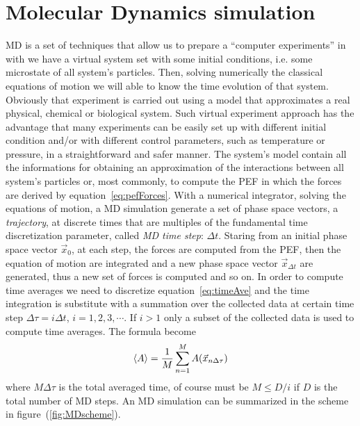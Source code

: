 \section{Molecular Dynamics simulation}
\acf{MD} is a set of techniques that allow us to prepare a ``computer experiments'' in with we have a virtual system set with some initial conditions, i.e. some microstate of all system's particles. Then, solving numerically the classical equations of motion we will able to know the time evolution of that system. Obviously that experiment is carried out using a model that approximates a real physical, chemical or biological system. Such virtual experiment approach has the advantage that many experiments can be easily set up with different initial condition and/or with different control parameters, such as temperature or pressure, in a straightforward and safer manner. The system's model contain all the informations for obtaining an approximation of the interactions between all system's particles or, most commonly, to compute the \ac{PEF} in which the forces are derived by equation~\eqref{eq:pefForces}. With a numerical integrator, solving the equations of motion, a \ac{MD} simulation generate a set of phase space vectors, a \textit{trajectory}, at discrete times that are multiples of the fundamental time discretization parameter, called \textit{MD time step}: $\Delta t$. Staring from an initial phase space vector $\vec x_0$, at each step, the forces are computed from the \ac{PEF}, then the equation of motion are integrated and a new phase space vector $\vec x_{\Delta t}$ are generated, thus a new set of forces is computed and so on. In order to compute time averages we need to discretize equation~\eqref{eq:timeAve} and the time integration is substitute with a summation over the collected data at certain time step $\Delta \tau = i \Delta t$, $i=1,2,3,\cdots$. If $i > 1$ only a subset of the collected data is used to compute time averages. The formula become
\begin{equation}
	\langle A \rangle = \frac{1}{M}\sum_{n=1}^M A(\vec x_{n\Delta \tau})
	\label{eq:MDTimeAve}
\end{equation}
where $M\Delta \tau$ is the total averaged time, of course must be $M \le D/i$ if $D$ is the total number of \ac{MD} steps. An \ac{MD} simulation can be summarized in the scheme in figure~(\ref{fig:MDscheme}).
